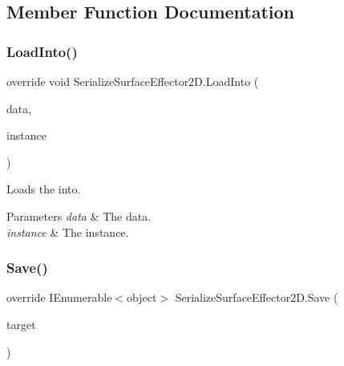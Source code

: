 \subsection{Member Function Documentation}
\mbox{\label{class_serialize_surface_effector2_d_a6f5729529ff455ccca0bd4e4956db6f9}} 
\subsubsection{\texorpdfstring{Load\+Into()}{LoadInto()}}
{\footnotesize\ttfamily override void Serialize\+Surface\+Effector2\+D.\+Load\+Into (\begin{DoxyParamCaption}\item[{object \mbox{[}$\,$\mbox{]}}]{data,  }\item[{Surface\+Effector2D}]{instance }\end{DoxyParamCaption})\hspace{0.3cm}{\ttfamily [inline]}}



Loads the into. 


\begin{DoxyParams}{Parameters}
{\em data} & The data.\\
\hline
{\em instance} & The instance.\\
\hline
\end{DoxyParams}
\mbox{\label{class_serialize_surface_effector2_d_a728f9886c7374a743c7316db50cda5ce}} 
\subsubsection{\texorpdfstring{Save()}{Save()}}
{\footnotesize\ttfamily override I\+Enumerable$<$object$>$ Serialize\+Surface\+Effector2\+D.\+Save (\begin{DoxyParamCaption}\item[{Surface\+Effector2D}]{target }\end{DoxyParamCaption})\hspace{0.3cm}{\ttfamily [inline]}}



